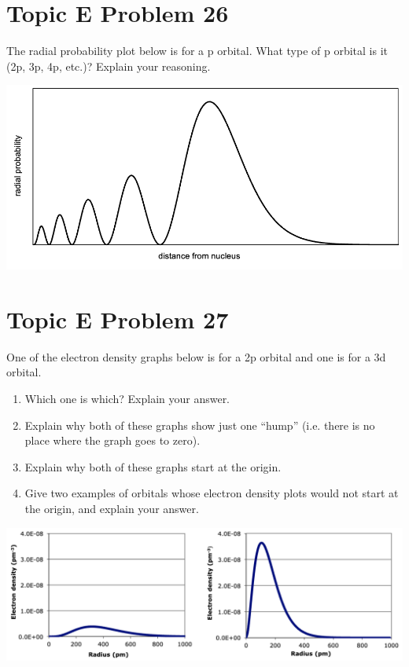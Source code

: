 \documentclass[10pt]{article}
\begin{document}
    \pagebreak
    \section{Topic E Problem 26}
        The radial probability plot below is for a p orbital. 
        What type of p orbital is it (2p, 3p, 4p, etc.)? 
        Explain your reasoning.
        \begin{center}
            \includegraphics[width=\textwidth]{img-E26.png}
        \end{center}

    \pagebreak
    \section{Topic E Problem 27}
        One of the electron density graphs below is for a 2p orbital and one is for a 3d orbital.
        \begin{enumerate}[label=\alph*)]
            \item   Which one is which? Explain your answer.
            \item   Explain why both of these graphs show just one “hump” (i.e. there is no place where the graph goes to zero).
            \item   Explain why both of these graphs start at the origin.
            \item   Give two examples of orbitals whose electron density plots would not start at the origin, and explain your answer.
        \end{enumerate}
        \begin{center}
            \includegraphics[width=\textwidth]{img-E27.png}
        \end{center}
\end{document}
